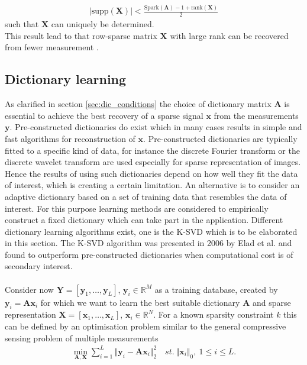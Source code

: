\begin{align*}
\vert \text{supp}(\mathbf{X}) \vert < \frac{\text{Spark} (\mathbf{A}) - 1 + \text{rank}(\mathbf{X})}{2}
\end{align*}
such that $\mathbf{X}$ can uniquely be determined.
\\
This result lead to that row-sparse matrix $\mathbf{X}$ with large rank can be recovered from fewer measurement \cite[p. 43]{CS}.


\subsection{Dictionary learning}\label{sec:dictionarylearning}
As clarified in section \ref{sec:dic_conditions} the choice of dictionary matrix $\textbf{A}$ is essential to achieve the best recovery of a sparse signal $\textbf{x}$ from the measurements $\textbf{y}$. Pre-constructed dictionaries do exist which in many cases results in simple and fast algorithms for reconstruction of $\textbf{x}$\cite{Elad_book}. Pre-constructed dictionaries are typically fitted to a specific kind of data, for instance the discrete Fourier transform or the discrete wavelet transform are used especially for sparse representation of images\cite{Elad_book}. Hence the results of using such dictionaries depend on how well they fit the data of interest, which is creating a certain limitation. An alternative is to consider an adaptive dictionary based on a set of training data that resembles the data of interest. For this purpose learning methods are considered to empirically construct a fixed dictionary which can take part in the application. Different dictionary learning algorithms exist, one is the K-SVD which is to be elaborated in this section. The K-SVD algorithm was presented in 2006 by Elad et al. and found to outperform pre-constructed dictionaries when computational cost is of secondary interest\cite{Elad2006}. \\
\\
Consider now $\textbf{Y}=\left[ \textbf{y}_1, \dots ,\textbf{y}_L \right]$, $\textbf{y}_i\in \mathbb{R}^{M}$ as a training database, created by $\textbf{y}_i=\textbf{A}\textbf{x}_i$ for which we want to learn the best suitable dictionary $\textbf{A}$ and sparse representation $\textbf{X}=\left[ \textbf{x}_1, \dots ,\textbf{x}_L \right]$, $\textbf{x}_i\in \mathbb{R}^{N}$. For a known sparsity constraint $k$ this can be defined by an optimisation problem similar to the general compressive sensing problem of multiple measurements \cite{Elad_book}
\begin{align}
\min_{\mathbf{A,X}} \sum_{i=1}^{L} \Vert \mathbf{y} _i - \mathbf{Ax}_i \Vert_2^2 \quad st. \ \Vert \textbf{x}_i\Vert_0, \ 1\leq i \leq L.\label{eq:SVD1}
\end{align}  
